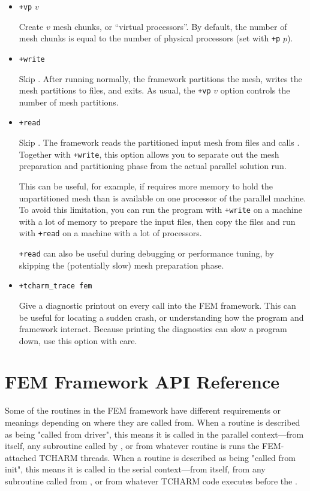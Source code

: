 \documentclass[10pt]{article}
\begin{document}
\begin{itemize}
\item {\tt +vp} $v$  

Create $v$ mesh chunks, or ``virtual processors''.
By default, the number of mesh chunks is equal to the number of 
physical processors (set with {\tt +p} $p$).


\item {\tt +write}

Skip .
After running  normally, the framework partitions the mesh, 
writes the mesh partitions to files, and exits.  As usual, the
{\tt +vp} $v$ option controls the number of mesh partitions.


\item {\tt +read}

Skip .
The framework reads the partitioned input mesh from files
and calls .  Together with {\tt +write}, this option
allows you to separate out the mesh preparation and partitioning 
phase from the actual parallel solution run.

This can be useful, for example, if  requires more memory 
to hold the unpartitioned mesh than is available on one processor of 
the parallel machine.  To avoid this limitation, you can run the program
with {\tt +write} on a machine with a lot of memory to prepare the input
files, then copy the files and run with {\tt +read} on a machine with 
a lot of processors.

{\tt +read} can also be useful during debugging or performance tuning, 
by skipping the (potentially slow) mesh preparation phase.


\item {\tt +tcharm\_trace fem}

Give a diagnostic printout on every call into the FEM framework.
This can be useful for locating a sudden crash, or understanding
how the program and framework interact.  Because printing the 
diagnostics can slow a program down, use this option with care.

\end{itemize}


\section{FEM Framework API Reference}

Some of the routines in the FEM framework have different requirements or meanings
depending on where they are called from.  When a routine is described
as being "called from driver", this means it is called in the parallel
context---from  itself, any subroutine called by ,
or from whatever routine is runs the FEM-attached TCHARM threads.
When a routine is described as being "called from init", this means it is 
called in the serial context---from  itself, from any subroutine
called from , or from whatever TCHARM code executes before the
.
\end{document}
